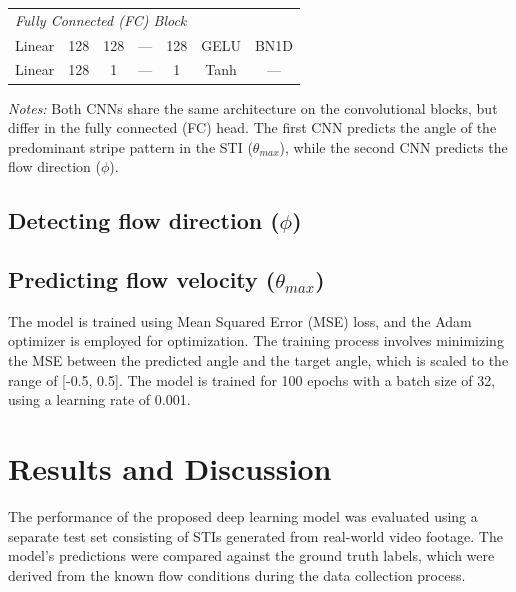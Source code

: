\documentclass[12pt]{elsarticle}
\begin{document}
\begin{table}[!htbp]
{\begin{tabular}{llccccc}
        \midrule
        \multicolumn{6}{l}{\textit{Fully Connected (FC) Block}} \\
        Linear                    & 128                 & 128                 & ---     & 128           & GELU    & BN1D   \\
        Linear                    & 128                 & 1                   & ---     & 1             & Tanh  & ---      \\
        \bottomrule
    \end{tabular}
    } %
    \par\medskip\footnotesize
    \textit{Notes:} Both CNNs share the same architecture on the convolutional blocks, but differ in the fully connected (FC) head. The first CNN predicts the angle of the predominant stripe pattern in the STI ($\theta_{max}$), while the second CNN predicts the flow direction ($\phi$). 
\end{table}

\subsection{Detecting flow direction ($\phi$)}


\subsection{Predicting flow velocity ($\theta_{max}$)}
The model is trained using Mean Squared Error (MSE) loss, and the Adam optimizer is employed for optimization. The training process involves minimizing the MSE between the predicted angle and the target angle, which is scaled to the range of [-0.5, 0.5]. The model is trained for 100 epochs with a batch size of 32, using a learning rate of 0.001.

\section{Results and Discussion}
\label{sec:Results}
The performance of the proposed deep learning model was evaluated using a separate test set consisting of STIs generated from real-world video footage. The model's predictions were compared against the ground truth labels, which were derived from the known flow conditions during the data collection process.


\newpage

\end{document}

